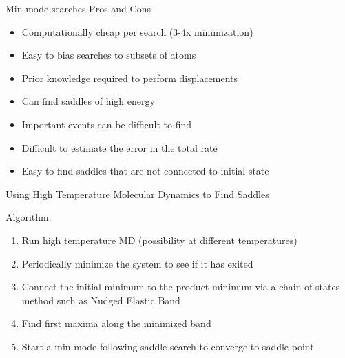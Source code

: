 \documentclass[onlymath]{beamer}
\begin{document}
\begin{frame}{Min-mode searches Pros and Cons}
 \begin{tcolorbox}[title=Pros,colback=white,colframe=green!50!black,]
    \begin{itemize}
	\item Computationally cheap per search (3-4x minimization)
	\item Easy to bias searches to subsets of atoms
    \end{itemize}
  \end{tcolorbox}

  \vspace{2mm}

  \begin{tcolorbox}[title=Cons,colback=white,colframe=red!50!black,]
    \begin{itemize}
	\item Prior knowledge required to perform displacements
	\item Can find saddles of high energy
	\item Important events can be difficult to find
	\item Difficult to estimate the error in the total rate
	\item Easy to find saddles that are not connected to initial state
    \end{itemize}
  \end{tcolorbox}
\end{frame}

\begin{frame}{Using High Temperature Molecular Dynamics to Find Saddles}

Algorithm:
\begin{enumerate}
	\item Run high temperature MD (possibility at different temperatures)
	\item Periodically minimize the system to see if it has exited
	\item Connect the initial minimum to the product minimum via a chain-of-states method such as Nudged Elastic Band
	\item Find first maxima along the minimized band
	\item Start a min-mode following saddle search to converge to saddle point
\end{enumerate}

\end{frame}
\end{document}
